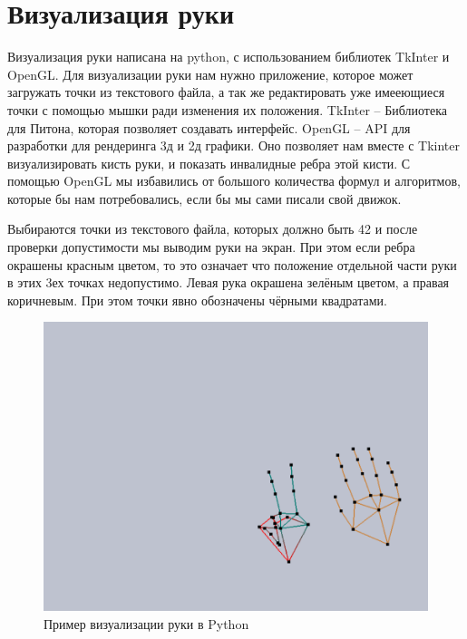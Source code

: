 \section{Визуализация руки}

\hspace{0.6cm} Визуализация руки написана на python, с использованием библиотек TkInter и OpenGL. Для визуализации руки нам нужно приложение, которое может загружать точки из текстового файла, а так же редактировать уже имееющиеся точки с помощью мышки ради изменения их положения.
\hspace{0.6cm} TkInter – Библиотека для Питона, которая позволяет создавать интерфейс.
\hspace{0.6cm} OpenGL – API для разработки для рендеринга 3д и 2д графики. Оно позволяет нам вместе с Tkinter визуализировать кисть руки, и показать инвалидные ребра этой кисти. С помощью OpenGL мы избавились от большого количества формул и алгоритмов, которые бы нам потребовались, если бы мы сами писали свой движок.

\hspace{0.6cm} Выбираются точки из текстового файла, которых должно быть 42 и после проверки допустимости мы выводим руки на экран. При этом если ребра окрашены красным цветом, то это означает что положение отдельной части руки в этих 3ех точках недопустимо.
\hspace{0.6cm} Левая рука окрашена зелёным цветом, а правая коричневым. При этом точки явно обозначены чёрными квадратами.
	
\begin{figure}[ht!]
	\centering
	\includegraphics[scale=0.5]{example.png}
	\caption{Пример визуализации руки в Python}
	\label{fig:VisHand}
\end{figure}